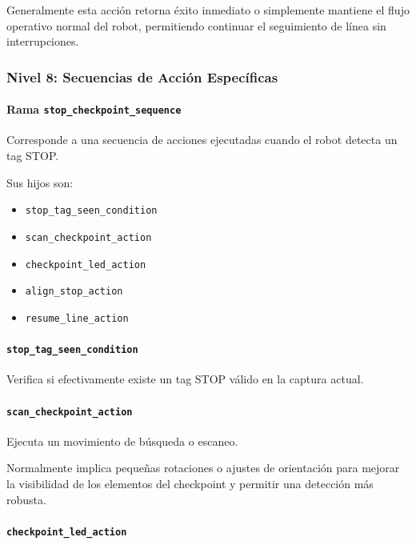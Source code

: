 \documentclass{prgrado}
\begin{document}
Generalmente esta acción retorna éxito inmediato o simplemente mantiene el flujo operativo normal del robot, permitiendo continuar el seguimiento de línea sin interrupciones.

\subsubsection{Nivel 8: Secuencias de Acción Específicas}

\paragraph{Rama \texttt{stop\_checkpoint\_sequence}}

Corresponde a una secuencia de acciones ejecutadas cuando el robot detecta un tag STOP.

Sus hijos son:

\begin{itemize}
    \item \texttt{stop\_tag\_seen\_condition}
    \item \texttt{scan\_checkpoint\_action}
    \item \texttt{checkpoint\_led\_action}
    \item \texttt{align\_stop\_action}
    \item \texttt{resume\_line\_action}
\end{itemize}

\paragraph{\texttt{stop\_tag\_seen\_condition}}

Verifica si efectivamente existe un tag STOP válido en la captura actual.

\paragraph{\texttt{scan\_checkpoint\_action}}

Ejecuta un movimiento de búsqueda o escaneo.

Normalmente implica pequeñas rotaciones o ajustes de orientación para mejorar la visibilidad de los elementos del checkpoint y permitir una detección más robusta.

\paragraph{\texttt{checkpoint\_led\_action}}
\end{document}
